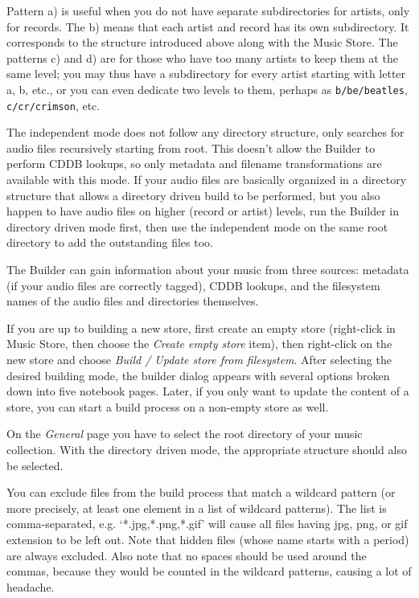 \documentclass[10pt,english]{article}
\begin{document}
\noindent Pattern a) is useful when you do not have separate
subdirectories for artists, only for records. The b) means
that each artist and record has its own subdirectory. It
corresponds to the structure introduced above along with the
Music Store. The patterns c) and d) are for those who have too
many artists to keep them at the same level; you may thus have
a subdirectory for every artist starting with letter a, b,
etc., or you can even dedicate two levels to them, perhaps as
\texttt{b/be/beatles}, \texttt{c/cr/crimson}, etc.




The independent mode does not follow any directory
structure, only searches for audio files recursively starting
from root. This doesn't allow the Builder to perform CDDB
lookups, so only metadata and filename transformations are
available with this mode. If your audio files are basically
organized in a directory structure that allows a directory
driven build to be performed, but you also happen to have
audio files on higher (record or artist) levels, run the
Builder in directory driven mode first, then use the
independent mode on the same root directory to add the
outstanding files too.




The Builder can gain information about your music from
three sources: metadata (if your audio files are correctly
tagged), CDDB lookups, and the filesystem names of the audio
files and directories themselves.




If you are up to building a new store, first create an
empty store (right-click in Music Store, then choose the
\textsl{Create empty store} item), then right-click on the
new store and choose \textsl{Build / Update store from
filesystem}. After selecting the desired building mode,
the builder dialog appears with several options broken down
into five notebook pages. Later, if you only want to update
the content of a store, you can start a build process on a
non-empty store as well.




On the \textsl{General} page you have to select the root
directory of your music collection. With the directory driven
mode, the appropriate structure should also be selected.




You can exclude files from the build process that match a
wildcard pattern (or more precisely, at least one element in a
list of wildcard patterns). The list is comma-separated,
e.g. `*.jpg,*.png,*.gif' will cause all files having jpg,
png, or gif extension to be left out. Note that hidden files
(whose name starts with a period) are always excluded. Also
note that no spaces should be used around the commas, because
they would be counted in the wildcard patterns, causing a lot
of headache.
\end{document}

